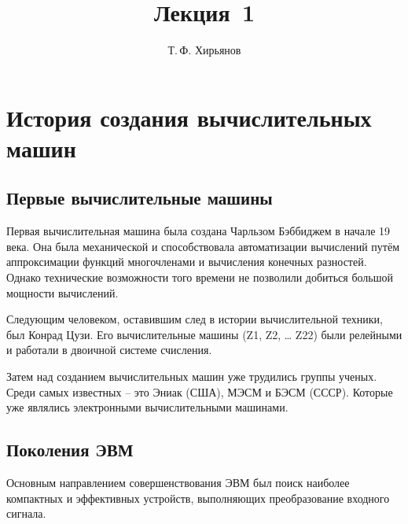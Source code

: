 \documentclass[a4paper, fleqn]{article}
\title{Лекция \textnumero\,1}
\author{Т.\,Ф. Хирьянов}
\date{}
\begin{document}
	\maketitle
	\section*{История создания вычислительных машин}
	
	\subsection*{Первые вычислительные машины}
		Первая вычислительная машина была создана  Чарльзом Бэббиджем в начале 19 века. Она была механической и способствовала автоматизации вычислений путём аппроксимации функций многочленами и вычисления конечных разностей. Однако технические возможности того времени не позволили добиться большой мощности вычислений.
		
		Следующим человеком, оставившим след в истории вычислительной техники, был Конрад Цузи. Его вычислительные машины (Z1, Z2, … Z22) были релейными и работали в двоичной системе счисления. 
		
		Затем над созданием вычислительных машин уже трудились группы ученых. Среди самых известных – это Эниак (США), МЭСМ и БЭСМ (СССР). Которые уже являлись электронными вычислительными машинами.
		
	\subsection*{Поколения ЭВМ}
	
		Основным направлением совершенствования ЭВМ был поиск наиболее компактных и эффективных устройств, выполняющих преобразование входного сигнала.
			
\end{document}
